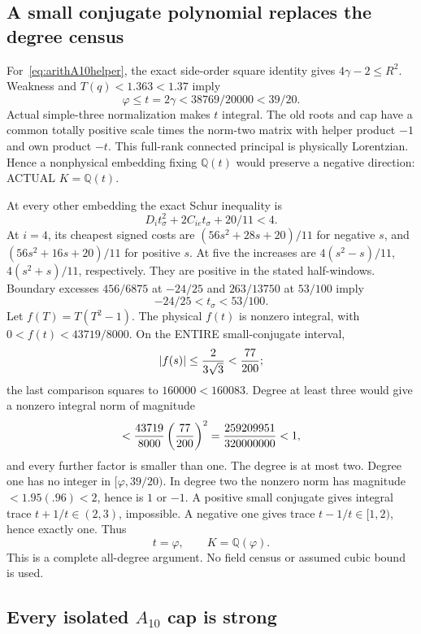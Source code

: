 \documentclass[11pt]{article}
\begin{document}
\subsection{A small conjugate polynomial replaces the degree census}
\label{app:arithA10helperfield}

For~\eqref{eq:arithA10helper}, the exact
side-order square identity gives
\(4\gamma-2\le R^2\).
Weakness and \(T(q)<1.363<1.37\) imply
\[
             \varphi\le t=2\gamma
                     <38769/20000<39/20 .
\]
Actual simple-three normalization makes
\(t\) integral.
The old roots and cap have a common
totally positive scale times the norm-two
matrix with helper product \(-1\) and
own product \(-t\).
This full-rank connected principal is
physically Lorentzian.
Hence a nonphysical embedding fixing
\(\mathbb Q(t)\) would preserve a negative
direction: ACTUAL \(K=\mathbb Q(t)\).

At every other embedding the exact Schur
inequality is
\[
                  D_i t_\sigma^2+2C_{ie}t_\sigma+20/11<4 .
\]
At \(i=4\), its cheapest signed costs are
\((56s^2+28s+20)/11\) for negative \(s\),
and \((56s^2+16s+20)/11\) for positive \(s\).
At five the increases are
\(4(s^2-s)/11\), \(4(s^2+s)/11\), respectively.
They are positive in the stated half-windows.
Boundary excesses \(456/6875\) at \(-24/25\)
and \(263/13750\) at \(53/100\) imply
\[
                   -24/25<t_\sigma<53/100 .
\]
Let \(f(T)=T(T^2-1)\).
The physical \(f(t)\) is nonzero integral,
with \(0<f(t)<43719/8000\).
On the ENTIRE small-conjugate interval,
\[
 |f(s)|\le {2\over3\sqrt3}<{77\over200};
\]
the last comparison squares to
\(160000<160083\).
Degree at least three would give a nonzero
integral norm of magnitude
\[
 <{43719\over8000}\left({77\over200}\right)^2
 ={259209951\over320000000}<1 ,
\]
and every further factor is smaller than one.
The degree is at most two.
Degree one has no integer in
\([\varphi,39/20)\).
In degree two the nonzero norm has magnitude
\(<1.95(.96)<2\), hence is \(1\) or \(-1\).
A positive small conjugate gives integral
trace \(t+1/t\in(2,3)\), impossible.
A negative one gives trace
\(t-1/t\in[1,2)\), hence exactly one.
Thus
\[
                 t=\varphi,\qquad K=\mathbb Q(\varphi).
\tag{A10gold}\label{eq:arithA10gold}
\]
This is a complete all-degree argument.
No field census or assumed cubic bound is used.

\subsection{Every isolated \(A_{10}\) cap is strong}
\label{app:arithA10isolated}
\end{document}
